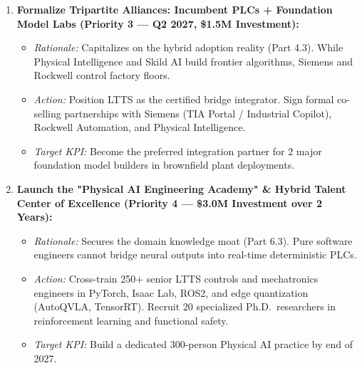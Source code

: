 \documentclass[11pt,a4paper]{article}
\begin{document}
\begin{enumerate}
    \item \textbf{Formalize Tripartite Alliances: Incumbent PLCs + Foundation Model Labs (Priority 3 --- Q2 2027, \$1.5M Investment):}
    \begin{itemize}
        \item \textit{Rationale:} Capitalizes on the hybrid adoption reality (Part 4.3). While Physical Intelligence and Skild AI build frontier algorithms, Siemens and Rockwell control factory floors.
        \item \textit{Action:} Position LTTS as the certified bridge integrator. Sign formal co-selling partnerships with Siemens (TIA Portal / Industrial Copilot), Rockwell Automation, and Physical Intelligence.
        \item \textit{Target KPI:} Become the preferred integration partner for 2 major foundation model builders in brownfield plant deployments.
    \end{itemize}

    \item \textbf{Launch the "Physical AI Engineering Academy" \& Hybrid Talent Center of Excellence (Priority 4 --- \$3.0M Investment over 2 Years):}
    \begin{itemize}
        \item \textit{Rationale:} Secures the domain knowledge moat (Part 6.3). Pure software engineers cannot bridge neural outputs into real-time deterministic PLCs.
        \item \textit{Action:} Cross-train 250+ senior LTTS controls and mechatronics engineers in PyTorch, Isaac Lab, ROS2, and edge quantization (AutoQVLA, TensorRT). Recruit 20 specialized Ph.D.\ researchers in reinforcement learning and functional safety.
        \item \textit{Target KPI:} Build a dedicated 300-person Physical AI practice by end of 2027.
    \end{itemize}
\end{enumerate}
\end{document}
